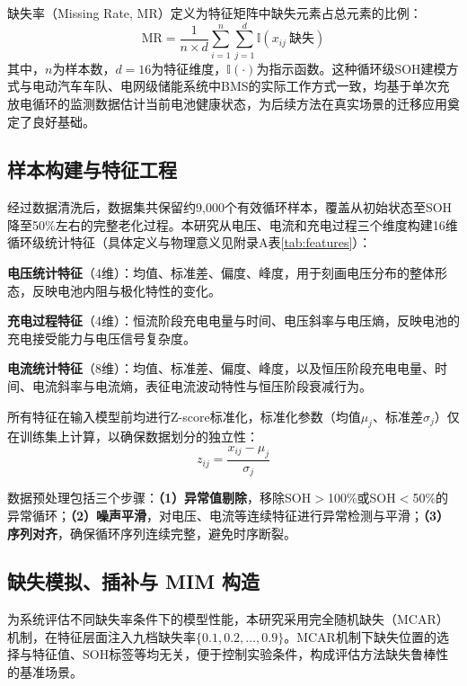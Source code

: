 \documentclass[10pt,a4paper]{ctexart}
\begin{document}
缺失率（Missing Rate, MR）定义为特征矩阵中缺失元素占总元素的比例：
\begin{equation}
    \text{MR} = \frac{1}{n \times d} \sum_{i=1}^{n}\sum_{j=1}^{d} \mathbb{I}(x_{ij}\ \text{缺失})
    \label{eq:mr}
\end{equation}
其中，$n$为样本数，$d=16$为特征维度，$\mathbb{I}(\cdot)$为指示函数。这种循环级SOH建模方式与电动汽车车队、电网级储能系统中BMS的实际工作方式一致，均基于单次充放电循环的监测数据估计当前电池健康状态，为后续方法在真实场景的迁移应用奠定了良好基础。

\subsection{样本构建与特征工程}

经过数据清洗后，数据集共保留约9,000个有效循环样本，覆盖从初始状态至SOH降至50\%左右的完整老化过程。本研究从电压、电流和充电过程三个维度构建16维循环级统计特征（具体定义与物理意义见附录A表\ref{tab:features}）：

\textbf{电压统计特征}（4维）：均值、标准差、偏度、峰度，用于刻画电压分布的整体形态，反映电池内阻与极化特性的变化。

\textbf{充电过程特征}（4维）：恒流阶段充电电量与时间、电压斜率与电压熵，反映电池的充电接受能力与电压信号复杂度。

\textbf{电流统计特征}（8维）：均值、标准差、偏度、峰度，以及恒压阶段充电电量、时间、电流斜率与电流熵，表征电流波动特性与恒压阶段衰减行为。

所有特征在输入模型前均进行Z-score标准化，标准化参数（均值$\mu_j$、标准差$\sigma_j$）仅在训练集上计算，以确保数据划分的独立性：
\begin{equation}
    z_{ij} = \frac{x_{ij} - \mu_j}{\sigma_j}
\end{equation}

数据预处理包括三个步骤：\textbf{（1）异常值剔除}，移除SOH$>$100\%或SOH$<$50\%的异常循环；\textbf{（2）噪声平滑}，对电压、电流等连续特征进行异常检测与平滑；\textbf{（3）序列对齐}，确保循环序列连续完整，避免时序断裂。

\subsection{缺失模拟、插补与 MIM 构造}

为系统评估不同缺失率条件下的模型性能，本研究采用完全随机缺失（MCAR）机制，在特征层面注入九档缺失率$\{0.1, 0.2, \ldots, 0.9\}$。MCAR机制下缺失位置的选择与特征值、SOH标签等均无关，便于控制实验条件，构成评估方法缺失鲁棒性的基准场景。
\end{document}
